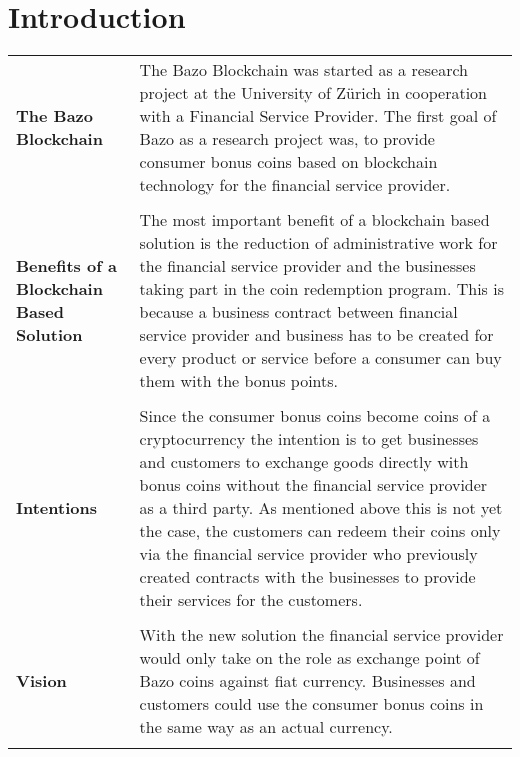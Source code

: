 \chapter{Introduction}
\thispagestyle{main} %

\begin{tabular}[t]{ p{3cm} p{12.5cm}}

\raggedright
\textbf{The Bazo Blockchain} &
The Bazo Blockchain was started as a research project at the University of Zürich in cooperation with a Financial Service Provider. The first goal of Bazo as a research project was, to provide consumer bonus coins based on blockchain technology for the financial service provider. \\ \\

\raggedright
\textbf{Benefits of a Blockchain Based Solution} &
The most important benefit of a blockchain based solution is the reduction of administrative work for the financial service provider and the businesses taking part in the coin redemption program. This is because a business contract between financial service provider and business has to be created for every product or service before a consumer can buy them with the bonus points.  \\ \\

\textbf{Intentions} &
Since the consumer bonus coins become coins of a cryptocurrency the intention is to get businesses and customers to exchange goods directly with bonus coins without the financial service provider as a third party. As mentioned above this is not yet the case, the customers can redeem their coins only via the financial service provider who previously created contracts with the businesses to provide their services for the customers. \\ \\

\textbf{Vision} &
With the new solution the financial service provider would only take on the role as exchange point of Bazo coins against fiat currency. Businesses and customers could use the consumer bonus coins in the same way as an actual currency. \\ \\


\end{tabular}
